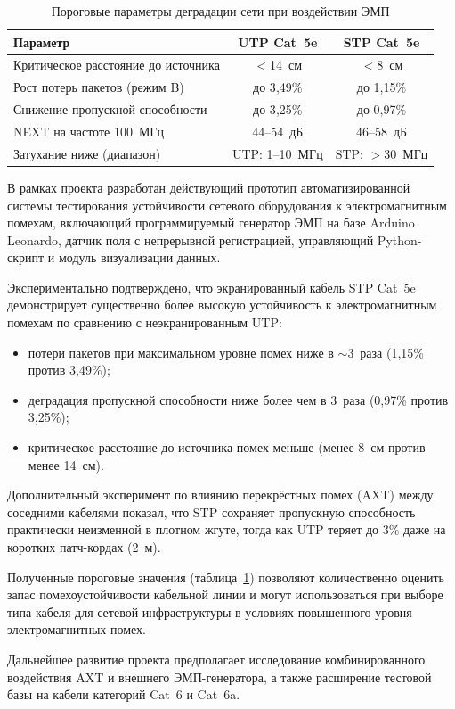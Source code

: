 \begin{table}[H]
  \centering
  \caption{Пороговые параметры деградации сети при воздействии ЭМП}
  \label{tab:thresholds}
  \begin{tabular}{|p{5.8cm}|c|c|}
    \hline
    \textbf{Параметр} & \textbf{UTP Cat~5e} & \textbf{STP Cat~5e} \\
    \hline
    Критическое расстояние до источника & $<$14~см   & $<$8~см   \\
    Рост потерь пакетов (режим B)      & до 3{,}49\%& до 1{,}15\%\\
    Снижение пропускной способности    & до 3{,}25\%& до 0{,}97\%\\
    NEXT на частоте 100~МГц            & 44--54~дБ  & 46--58~дБ  \\
    Затухание ниже (диапазон) & UTP: 1--10~МГц & STP: $>$30~МГц \\
    \hline
  \end{tabular}
\end{table}


В рамках проекта разработан действующий прототип
автоматизированной системы тестирования
устойчивости сетевого оборудования к электромагнитным
помехам, включающий программируемый генератор ЭМП
на базе Arduino Leonardo, датчик поля с непрерывной регистрацией,
управляющий Python-скрипт и модуль визуализации данных.

Экспериментально подтверждено, что экранированный кабель
STP Cat~5e демонстрирует существенно более высокую
устойчивость к электромагнитным помехам по сравнению
с неэкранированным UTP:
\begin{itemize}
  \item потери пакетов при максимальном уровне помех
        ниже в $\sim$3~раза (1{,}15\% против 3{,}49\%);
  \item деградация пропускной способности ниже
        более чем в 3~раза (0{,}97\% против 3{,}25\%);
  \item критическое расстояние до источника помех
        меньше (менее 8~см против менее 14~см).
\end{itemize}

Дополнительный эксперимент по влиянию перекрёстных
помех (AXT) между соседними кабелями показал,
что STP сохраняет пропускную способность практически
неизменной в плотном жгуте, тогда как UTP теряет
до 3\% даже на коротких патч-кордах (2~м).

Полученные пороговые значения (таблица~\ref{tab:thresholds})
позволяют количественно оценить запас помехоустойчивости
кабельной линии и могут использоваться при выборе
типа кабеля для сетевой инфраструктуры в условиях
повышенного уровня электромагнитных помех.

Дальнейшее развитие проекта предполагает
исследование комбинированного воздействия AXT и внешнего
ЭМП-генератора, а также расширение тестовой базы
на кабели категорий Cat~6 и Cat~6a.

